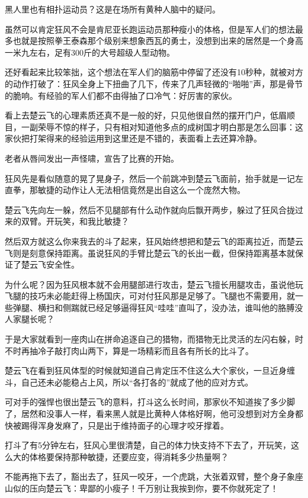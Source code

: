 黑人里也有相扑运动员？这是在场所有黄种人脑中的疑问。

虽然可以肯定狂风不会是肯尼亚长跑运动员那种瘦小的体格，但是军人们的想法最多也就是按照拳王泰森那个级别来想象西瓦的勇士，没想到出来的居然是一个身高一米九左右，足有300斤的大号超级人型动物。

还好看起来比较笨拙，这个想法在军人们的脑筋中停留了还没有10秒种，就被对方的动作打破了：狂风全身上下扭曲了几下，传来了几声轻微的“啪啪”声，那是骨节的脆响。有经验的军人们都不由得抽了口冷气：好厉害的家伙。

看上去楚云飞的心理素质还真不是一般的好，只见他很自然的摆开门户，低眉顺目，一副荣辱不惊的样子，只有相对知道他多点的成树国才明白那是怎么回事：这家伙把打架得来的经验运用到这里还是不错的，表面看上去还算冷静。

老者从唇间发出一声怪啸，宣告了比赛的开始。

狂风先是看似随意的晃了晃身子，然后一个前跳冲到楚云飞面前，抬手就是一记左直拳，那敏捷的动作让人无法相信竟然是出自这么一个庞然大物。

楚云飞先向左一躲，然后不见腿部有什么动作就向后飘开两步，躲过了狂风合拢过来的双臂。开玩笑，和我比敏捷？

然后双方就这么你来我去的斗了起来，狂风始终想把和楚云飞的距离拉近，而楚云飞则是刻意保持距离。虽说狂风的手臂比楚云飞的长出一截，但保持距离基本就保证了楚云飞安全性。

为什么呢？因为狂风根本就不会用腿部进行攻击，楚云飞擅长用腿攻击，虽说他玩飞腿的技巧未必能赶得上杨国庆，可对付狂风那是足够了。飞腿也不需要用，就一些弹腿、横扫和侧踹就已经足够逼得狂风“哇哇”直叫了，没办法，谁叫他的胳膊没人家腿长呢？

于是大家就看到一座肉山在拼命追逐自己的猎物，而猎物无比灵活的左闪右躲，时不时再抽冷子敲打肉山两下，算是一场精彩而且各有所长的比斗了。

楚云飞在看到狂风体型的时候就知道自己肯定压不住这么大个家伙，一旦近身缠斗，自己还未必能稳占上风，所以“各打各的”就成了他的应对方式。

可对手的强悍也很出楚云飞的意料，打斗这么长时间，那家伙不知道挨了多少脚了，居然和没事人一样，看来黑人就是比黄种人体格好啊，他可没想到对方全身都快被踢得浑身发麻了，只是出于维持面子的心理才咬牙撑着。

打斗了有5分钟左右，狂风心里很清楚，自己的体力快支持不下去了，开玩笑，这么大的体格要保持那种敏捷，还要应变，得消耗多少热量啊？

不能再拖下去了，豁出去了，狂风一咬牙，一个虎跳，大张着双臂，整个身子象座山似的压向楚云飞：卑鄙的小瘦子！千万别让我挨到你，要不你就死定了！

